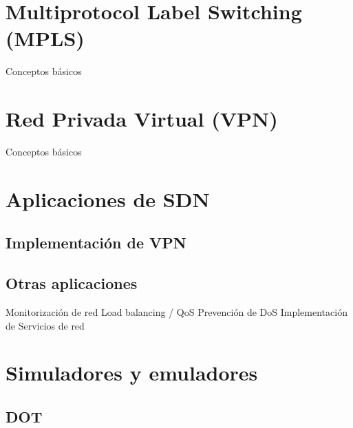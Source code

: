 



\section{Multiprotocol Label Switching (MPLS)}
Conceptos básicos

\section{Red Privada Virtual (VPN)}
Conceptos básicos

\section{Aplicaciones de SDN}
\subsection{Implementación de VPN}
\subsection{Otras aplicaciones}
Monitorización de red
Load balancing / QoS
Prevención de DoS
Implementación de Servicios de red

\section{Simuladores y emuladores}
\subsection{DOT} %
